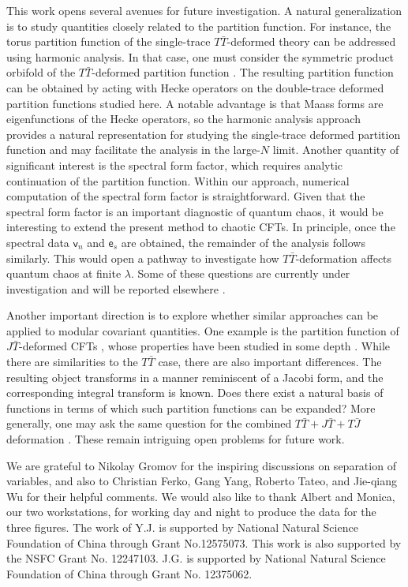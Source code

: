 \documentclass[aps,twocolumn,prl,showpacs,amsmath,amssymb,10pt]{revtex4-2}
\begin{document}
This work opens several avenues for future investigation. A natural generalization is to study quantities closely related to the partition function. For instance, the torus partition function of the single-trace $T\bar{T}$-deformed theory  can be addressed using harmonic analysis. In that case, one must consider the symmetric product orbifold of the $T\bar{T}$-deformed partition function \cite{Hashimoto:2019wct,Apolo:2023aho}. The resulting partition function can be obtained by acting with Hecke operators on the double-trace deformed partition functions studied here. A notable advantage is that Maass forms are eigenfunctions of the Hecke operators, so the harmonic analysis approach provides a natural representation for studying the single-trace deformed partition function and may facilitate the analysis in the large-$N$ limit. Another quantity of significant interest is the spectral form factor, which requires analytic continuation of the partition function. Within our approach, numerical computation of the spectral form factor is straightforward. Given that the spectral form factor is an important diagnostic of quantum chaos, it would be interesting to extend the present method to chaotic CFTs. In principle, once the spectral data $\mathsf{v}_n$ and $\mathsf{e}_s$ are obtained, the remainder of the analysis follows similarly. This would open a pathway to investigate how $T\bar{T}$-deformation affects quantum chaos at finite $\lambda$. Some of these questions are currently under investigation and will be reported elsewhere \cite{ToAppear}.

Another important direction is to explore whether similar approaches can be applied to modular covariant quantities. One example is the partition function of $J\bar{T}$-deformed CFTs \cite{Guica:2017lia}, whose properties have been studied in some depth \cite{Aharony:2018ics,Apolo:2019yfj}. While there are similarities to the $T\bar{T}$ case, there are also important differences. The resulting object transforms in a manner reminiscent of a Jacobi form, and the corresponding integral transform is known. Does there exist a natural basis of functions in terms of which such partition functions can be expanded? More generally, one may ask the same question for the combined $T\bar{T}+J\bar{T}+T\bar{J}$ deformation \cite{Chakraborty:2019mdf,Hashimoto:2019wct,Apolo:2021wcn}. These remain intriguing open problems for future work.

\vspace{0.5cm}


\vspace{0.5cm}
We are grateful to Nikolay Gromov for the inspiring discussions on separation of variables, and also to Christian Ferko, Gang Yang, Roberto Tateo, and Jie-qiang Wu for their helpful comments.
We would also like to thank Albert and Monica, our two workstations, for working day and night to produce the data for the three figures.
The work of Y.J. is supported by National Natural Science Foundation of China through Grant No.12575073. This work is also supported by the NSFC Grant No. 12247103. J.G. is supported by National Natural Science Foundation of China through Grant No. 12375062.
\end{document}
